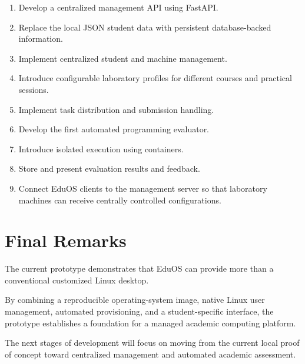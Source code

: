\documentclass{tietreport}
\begin{document}
\begin{enumerate}

    \item Develop a centralized management API using FastAPI.

    \item Replace the local JSON student data with persistent
    database-backed information.

    \item Implement centralized student and machine management.

    \item Introduce configurable laboratory profiles for different
    courses and practical sessions.

    \item Implement task distribution and submission handling.

    \item Develop the first automated programming evaluator.

    \item Introduce isolated execution using containers.

    \item Store and present evaluation results and feedback.

    \item Connect EduOS clients to the management server so that
    laboratory machines can receive centrally controlled
    configurations.

\end{enumerate}


\section{Final Remarks}

The current prototype demonstrates that EduOS can provide more than
a conventional customized Linux desktop.

By combining a reproducible operating-system image, native Linux
user management, automated provisioning, and a student-specific
interface, the prototype establishes a foundation for a managed
academic computing platform.

The next stages of development will focus on moving from the current
local proof of concept toward centralized management and automated
academic assessment.
\end{document}
